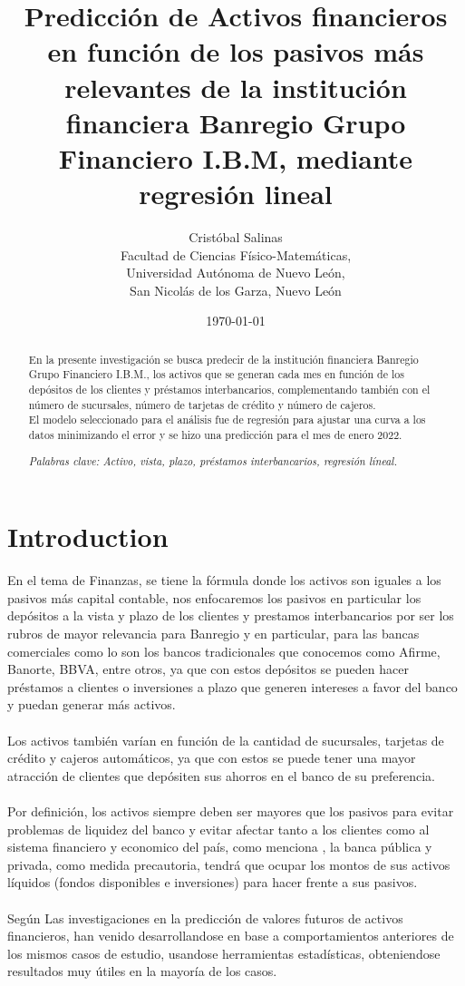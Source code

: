 \documentclass{article}
\title{Predicción de Activos financieros en función de los pasivos más relevantes de la institución financiera Banregio Grupo Financiero I.B.M, mediante regresión lineal}
\author{Cristóbal Salinas \\ 
        Facultad de Ciencias Físico-Matemáticas, \\Universidad Autónoma de Nuevo León, \\San Nicolás de los Garza, Nuevo León}
\date{\today}
\begin{document}
\maketitle

\begin{abstract}

En la presente investigación se busca predecir de la institución financiera Banregio Grupo Financiero I.B.M., los activos que se generan cada mes en función de los depósitos de los clientes y préstamos interbancarios, complementando también con el número de sucursales, número de tarjetas de crédito y número de cajeros. \\

El modelo seleccionado para el análisis fue de regresión para ajustar una curva a los datos minimizando el error y se hizo una predicción para el mes de enero 2022.

\textit{Palabras clave: Activo, vista, plazo, préstamos interbancarios, regresión líneal.}

\end{abstract}

\section{Introduction}

En el tema de Finanzas, se tiene la fórmula donde los activos son iguales a los pasivos más capital contable, nos enfocaremos los pasivos en particular los depósitos a la vista y plazo de los clientes y prestamos interbancarios por ser los rubros de mayor relevancia para Banregio y en particular, para las bancas comerciales como lo son los bancos tradicionales que conocemos como Afirme, Banorte, BBVA, entre otros, ya que con estos depósitos se pueden hacer préstamos a clientes o inversiones a plazo que generen intereses a favor del banco y puedan generar más activos.
\\
\\
Los activos también varían en función de la cantidad de sucursales, tarjetas de crédito y cajeros automáticos, ya que con estos se puede tener una mayor atracción de clientes que depósiten sus ahorros en el banco de su preferencia.
\\
\\
Por definición, los activos siempre deben ser mayores que los pasivos para evitar problemas de liquidez del banco y evitar afectar tanto a los clientes como al sistema financiero y economico del país, como menciona \citet{mu2021}, la banca pública y privada, como medida precautoria, tendrá que ocupar los montos de sus activos líquidos (fondos disponibles e inversiones) para hacer frente a sus pasivos.
\\
\\
Según \citet{san12} Las investigaciones en la predicción de valores futuros de activos financieros, han venido desarrollandose en base a comportamientos anteriores de los mismos casos de estudio, usandose herramientas estadísticas, obteniendose resultados muy útiles en la mayoría de los casos.
\end{document}
